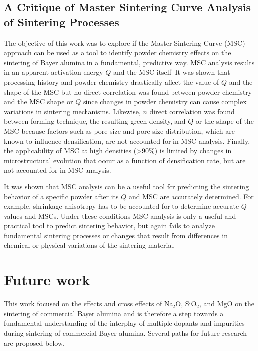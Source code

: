 \subsection{A Critique of Master Sintering Curve Analysis of Sintering Processes}
The objective of this work was to explore if the Master Sintering Curve (MSC) approach can be used as a tool to identify powder chemistry effects on the sintering of Bayer alumina in a fundamental, predictive way. MSC analysis results in an apparent activation energy $Q$ and the MSC itself. It was shown that processing history and powder chemistry drastically affect the value of $Q$ and the shape of the MSC but no direct correlation was found between powder chemistry and the MSC shape or $Q$ since changes in powder chemistry can cause complex variations in sintering mechanisms. Likewise, $n$ direct correlation was found between forming technique, the resulting green density, and $Q$ or the shape of the MSC because factors such as pore size and pore size distribution, which are known to influence densification, are not accounted for in MSC analysis. Finally, the applicability of MSC at high densities (>90\%) is limited by changes in microstructural evolution that occur as a function of densification rate, but are not accounted for in MSC analysis.

It was shown that MSC analysis can be a useful tool for predicting the sintering behavior of a specific powder after its $Q$ and MSC are accurately determined. For example, shrinkage anisotropy has to be accounted for to determine accurate $Q$ values and MSCs. Under these conditions MSC analysis is only a useful and practical tool to predict sintering behavior, but again fails to analyze fundamental sintering processes or changes that result from differences in chemical or physical variations of the sintering material.

\section{Future work}
This work focused on the effects and cross effects of Na$_{2}$O, SiO$_{2}$, and MgO on the sintering of commercial Bayer alumina and is therefore a step towards a fundamental understanding of the interplay of multiple dopants and impurities during sintering of commercial Bayer alumina. Several paths for future research are proposed below.

